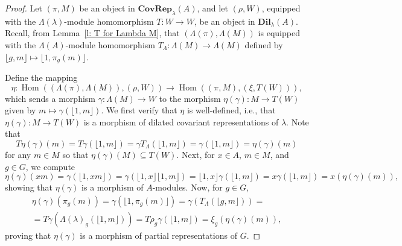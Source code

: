 \documentclass[10pt,a4paper]{amsart}
\newcommand{\Hom}{\operatorname{Hom}}
\begin{document}
\begin{proof}
    Let \((\pi, M)\) be an object in \(\textbf{CovRep}_{\lambda}(A)\), and let \((\rho, W)\), equipped with the \(\Lambda(\lambda)\)-module homomorphism \(T: W \to W\), be an object in \(\textbf{Dil}_{\lambda}(A)\). Recall, from Lemma~\ref{l: T for Lambda M}, that \((\Lambda(\pi), \Lambda(M))\) is equipped with the \(\Lambda(A)\)-module homomorphism \(T_\Lambda: \Lambda(M) \to \Lambda(M)\) defined by \(\lfloor g, m \rfloor \mapsto \lfloor 1, \pi_g(m) \rfloor\).

    Define the mapping
    \[
        \eta: \Hom((\Lambda(\pi), \Lambda(M)), (\rho, W)) \to \Hom((\pi, M), (\xi, T(W))),
    \]
    which sends a morphism \(\gamma: \Lambda(M) \to W\) to the morphism \(\eta(\gamma): M \to T(W)\) given by \(m \mapsto \gamma(\lfloor 1, m \rfloor)\). We first verify that \(\eta\) is well-defined, i.e., that \(\eta(\gamma): M \to T(W)\) is a morphism of  dilated covariant representations of \(\lambda\). 
   Note that
    $$T \eta(\gamma)(m) = T \gamma (\lfloor 1, m \rfloor) = \gamma T_{\Lambda}  (\lfloor 1, m \rfloor) = \gamma   (\lfloor 1, m \rfloor) =  \eta(\gamma)(m) $$ for any $m\in M$  so that
    $ \eta(\gamma)(M) \subseteq T(W).$ 
    Next, for  \(x \in A\), \(m \in M\), and \(g \in G\), we compute
    \[
        \eta(\gamma)(xm) = \gamma(\lfloor 1, xm \rfloor) = \gamma(\lfloor 1, x \rfloor \lfloor 1, m \rfloor) = \lfloor 1, x \rfloor \gamma(\lfloor 1, m \rfloor) = x\gamma(\lfloor 1, m \rfloor)
        = x (\eta(\gamma)(m)),
    \]
    showing that \(\eta(\gamma)\) is a morphism of \(A\)-modules. Now, for \(g \in G\),
\begin{multline*}
\eta(\gamma)(\pi_g(m)) = \gamma(\lfloor 1, \pi_g(m) \rfloor) = \gamma(T_\Lambda(\lfloor g, m \rfloor)) =\\= T\gamma(\Lambda(\lambda)_g(\lfloor 1, m \rfloor))
= T\rho_g\gamma(\lfloor 1, m \rfloor) = \xi_g(\eta(\gamma)(m)),
\end{multline*}    
    proving that \(\eta(\gamma)\) is a morphism of partial representations  of $G.$


\end{proof}
\end{document}
